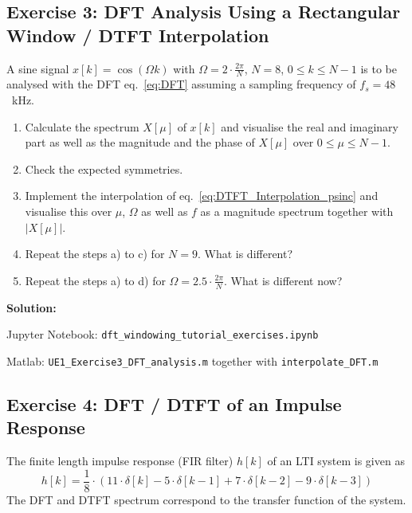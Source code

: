 \documentclass[11pt,a4paper,DIV=12]{scrartcl}
\begin{document}
\subsection*{Exercise 3: DFT Analysis Using a Rectangular Window / DTFT Interpolation}
A sine signal $x[k]=\cos(\Omega k)$ with $\Omega=2\cdot\frac{2\pi}{N}$, $N=8$,
$0\leq k \leq N-1$ is to be analysed with the DFT eq.~\eqref{eq:DFT} assuming a
sampling frequency of $f_s=48$~kHz.
%
\begin{enumerate}[label=\alph*)]
	\item Calculate the spectrum $X[\mu]$ of $x[k]$ and visualise the real and
	imaginary part as well as the magnitude and the phase of $X[\mu]$ over
	$0\leq\mu\leq N-1$.
%
	\item Check the expected symmetries.
%
	\item Implement the interpolation of eq.~\eqref{eq:DTFT_Interpolation_psinc}
	and visualise this over $\mu$, $\Omega$ as well as $f$ as a magnitude
	spectrum together with $|X[\mu]|$.
%
	\item Repeat the steps a) to c) for $N=9$. What is different?
%
	\item Repeat the steps a) to d) for $\Omega=2.5\cdot\frac{2\pi}{N}$.
	What is different now?
\end{enumerate}

\begin{Loesung}
\textbf{Solution:}

Jupyter Notebook: \texttt{dft\_windowing\_tutorial\_exercises.ipynb}

Matlab: \texttt{UE1\_Exercise3\_DFT\_analysis.m}
together with \texttt{interpolate\_DFT.m}
\end{Loesung}



\subsection*{Exercise 4: DFT / DTFT of an Impulse Response}
The finite length impulse response (FIR filter) $h[k]$ of an LTI system is given
as
%
\begin{equation}
h[k]=\frac{1}{8}\cdot\left(11\cdot\delta[k]-5\cdot\delta[k-1]+7\cdot\delta[k-2]-9\cdot\delta[k-3]\right)
\end{equation}
%
The DFT and DTFT spectrum correspond to the transfer function of the system.
\end{document}
